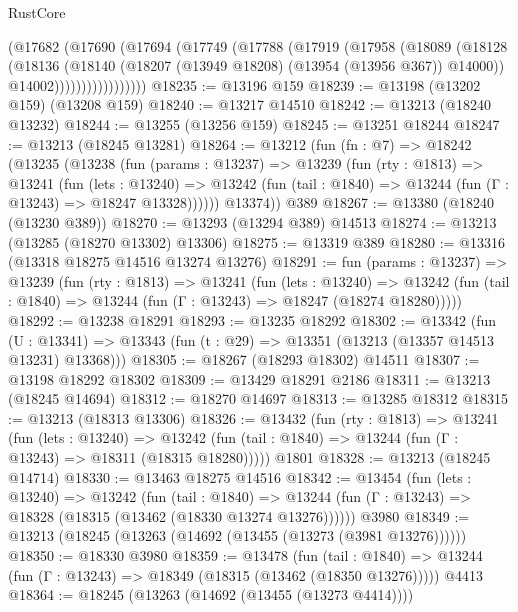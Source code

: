 \begin{lexlean}{RustCore}
\begin{coremodule}
                  (@17682
                    (@17690
                      (@17694
                        (@17749
                          (@17788
                            (@17919
                              (@17958
                                (@18089
                                  (@18128
                                    (@18136
                                      (@18140
                                        (@18207 (@13949 @18208) (@13954 (@13956 @367)) @14000))
                                      @14002)))))))))))))))))
@18235 := @13196 @159
@18239 := @13198 (@13202 @159) (@13208 @159)
@18240 := @13217 @14510
@18242 := @13213 (@18240 @13232)
@18244 := @13255 (@13256 @159)
@18245 := @13251 @18244
@18247 := @13213 (@18245 @13281)
@18264 := @13212
    (fun (fn : @7) =>
    @18242
      (@13235
        (@13238
          (fun (params : @13237) =>
          @13239
            (fun (rty : @1813) =>
            @13241
              (fun (lets : @13240) =>
              @13242 (fun (tail : @1840) => @13244 (fun (Γ : @13243) => @18247 @13328))))))
        @13374))
    @389
@18267 := @13380 (@18240 (@13230 @389))
@18270 := @13293 (@13294 @389) @14513
@18274 := @13213 (@13285 (@18270 @13302) @13306)
@18275 := @13319 @389
@18280 := @13316 (@13318 @18275 @14516 @13274 @13276)
@18291 := fun (params : @13237) =>
  @13239
    (fun (rty : @1813) =>
    @13241
      (fun (lets : @13240) =>
      @13242 (fun (tail : @1840) => @13244 (fun (Γ : @13243) => @18247 (@18274 @18280)))))
@18292 := @13238 @18291
@18293 := @13235 @18292
@18302 := @13342
    (fun (U : @13341) => @13343 (fun (t : @29) => @13351 (@13213 (@13357 @14513 @13231) @13368)))
@18305 := @18267 (@18293 @18302) @14511
@18307 := @13198 @18292 @18302
@18309 := @13429 @18291 @2186
@18311 := @13213 (@18245 @14694)
@18312 := @18270 @14697
@18313 := @13285 @18312
@18315 := @13213 (@18313 @13306)
@18326 := @13432
    (fun (rty : @1813) =>
    @13241
      (fun (lets : @13240) =>
      @13242 (fun (tail : @1840) => @13244 (fun (Γ : @13243) => @18311 (@18315 @18280)))))
    @1801
@18328 := @13213 (@18245 @14714)
@18330 := @13463 @18275 @14516
@18342 := @13454
    (fun (lets : @13240) =>
    @13242
      (fun (tail : @1840) =>
      @13244 (fun (Γ : @13243) => @18328 (@18315 (@13462 (@18330 @13274 @13276))))))
    @3980
@18349 := @13213 (@18245 (@13263 (@14692 (@13455 (@13273 (@3981 @13276))))))
@18350 := @18330 @3980
@18359 := @13478
    (fun (tail : @1840) => @13244 (fun (Γ : @13243) => @18349 (@18315 (@13462 (@18350 @13276)))))
    @4413
@18364 := @18245 (@13263 (@14692 (@13455 (@13273 @4414))))

\end{coremodule}
\end{lexlean}
